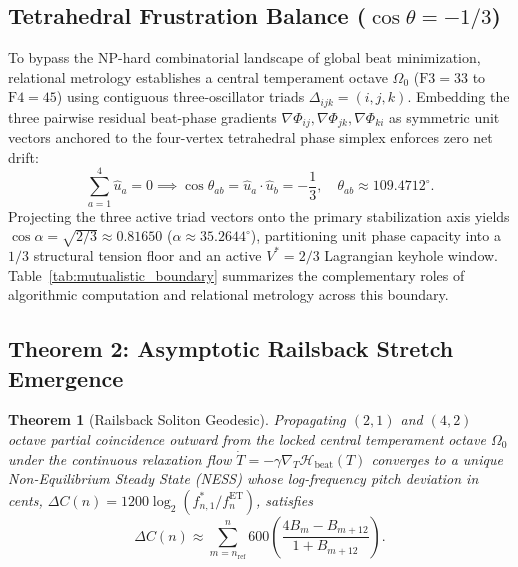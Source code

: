 \documentclass[aps,prl,twocolumn,superscriptaddress,10pt]{revtex4-2}
\newtheorem{theorem}{Theorem}[section]
\begin{document}
\subsection{Tetrahedral Frustration Balance (\texorpdfstring{$\cos\theta = -1/3$}{cos(theta) = -1/3})}

To bypass the NP-hard combinatorial landscape of global beat minimization, relational metrology establishes a central temperament octave $\Omega_0$ ($\text{F3}=33$ to $\text{F4}=45$) using contiguous three-oscillator triads $\Delta_{ijk} = (i,j,k)$. Embedding the three pairwise residual beat-phase gradients $\nabla\Phi_{ij}, \nabla\Phi_{jk}, \nabla\Phi_{ki}$ as symmetric unit vectors anchored to the four-vertex tetrahedral phase simplex enforces zero net drift:
\begin{equation}
\sum_{a=1}^4 \hat{u}_a = 0 \implies \cos\theta_{ab} = \hat{u}_a \cdot \hat{u}_b = -\frac{1}{3}, \quad \theta_{ab} \approx 109.4712^\circ.
\label{eq:tetrahedral_angle}
\end{equation}
Projecting the three active triad vectors onto the primary stabilization axis yields $\cos\alpha = \sqrt{2/3} \approx 0.81650$ ($\alpha \approx 35.2644^\circ$), partitioning unit phase capacity into a $1/3$ structural tension floor and an active $V^* = 2/3$ Lagrangian keyhole window. Table~\ref{tab:mutualistic_boundary} summarizes the complementary roles of algorithmic computation and relational metrology across this boundary.

\subsection{Theorem 2: Asymptotic Railsback Stretch Emergence}

\begin{theorem}[Railsback Soliton Geodesic]
\label{thm:railsback}
Propagating $(2,1)$ and $(4,2)$ octave partial coincidence outward from the locked central temperament octave $\Omega_0$ under the continuous relaxation flow $\dot{T} = -\gamma \nabla_T \mathcal{H}_{\text{beat}}(T)$ converges to a unique Non-Equilibrium Steady State (NESS) whose log-frequency pitch deviation in cents, $\Delta C(n) = 1200 \log_2(f_{n,1}^* / f_n^{\text{ET}})$, satisfies
\begin{equation}
\Delta C(n) \approx \sum_{m=n_{\text{ref}}}^{n} 600 \left( \frac{4 B_m - B_{m+12}}{1 + B_{m+12}} \right).
\label{eq:railsback_sum}
\end{equation}
\end{theorem}
\end{document}
